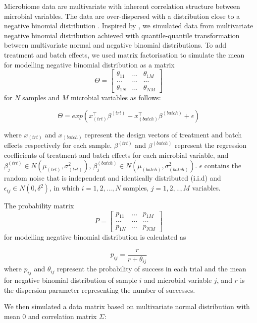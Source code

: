 \documentclass[
]{book}
\begin{document}
Microbiome data are multivariate with inherent correlation structure between microbial variables. The data are over-dispersed with a distribution close to a negative binomial distribution \citep{mcmurdie2014waste, quinn2018understanding}. Inspired by \citep{hawinkel2019broken}, we simulated data from multivariate negative binomial distribution achieved with quantile-quantile transformation between multivariate normal and negative binomial distributions. To add treatment and batch effects, we used matrix factorisation to simulate the mean for modelling negative binomial distribution as a matrix \[\Theta = \begin{bmatrix}
\theta_{11} & ...  & \theta_{1M}\\
...& ... & ... \\
\theta_{1N} & ... & \theta_{NM}
\end{bmatrix}\] for \(N\) samples and \(M\) microbial variables as follows:

\[\Theta = exp(x_{(trt)}^{\top}\beta^{(trt)} + x_{(batch)}^{\top}\beta^{(batch)} + \epsilon)\]

\noindent where \(x_{(trt)}\) and \(x_{(batch)}\) represent the design vectors of treatment and batch effects respectively for each sample. \(\beta^{(trt)}\) and \(\beta^{(batch)}\) represent the regression coefficients of treatment and batch effects for each microbial variable, and \(\beta^{(trt)}_{j} \in N(\mu_{(trt)},\sigma_{(trt)}^{2})\), \(\beta^{(batch)}_{j} \in N(\mu_{(batch)},\sigma_{(batch)}^{2})\). \(\epsilon\) contains the random noise that is independent and identically distributed (i.i.d) and \(\epsilon_{ij} \in N(0,\delta^{2})\), in which \(i = 1,2,...,N\) samples, \(j = 1,2,..,M\) variables.

The probability matrix \[P = \begin{bmatrix}
p_{11} & ...  & p_{1M}\\
...& ... & ... \\
p_{1N} & ... & p_{NM}
\end{bmatrix}\] for modelling negative binomial distribution is calculated as

\[p_{ij} = \frac{r}{r + \theta_{ij}}\]
\noindent where \(p_{ij}\) and \(\theta_{ij}\) represent the probability of success in each trial and the mean for negative binomial distribution of sample \(i\) and microbial variable \(j\), and \(r\) is the dispersion parameter representing the number of successes.

We then simulated a data matrix based on multivariate normal distribution with mean \(0\) and correlation matrix \(\Sigma\):
\end{document}
